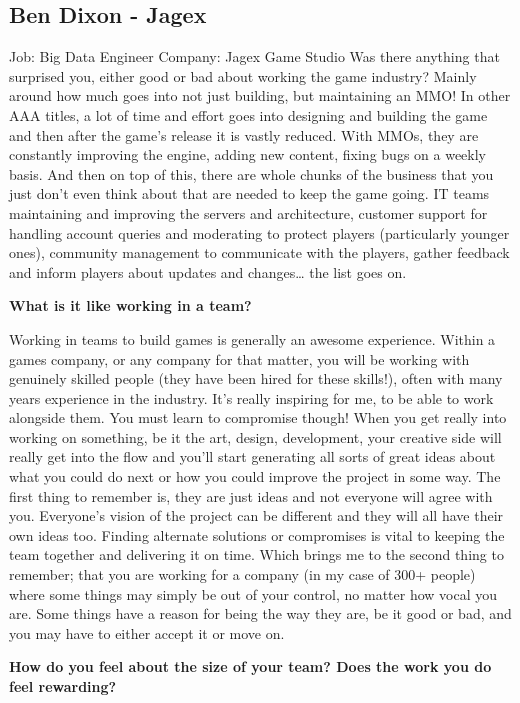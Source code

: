 \documentclass{scrartcl}
\begin{document}
\begin{itemize}
\begin{itemize}
\begin{appendices}
\section{Ben Dixon - Jagex}
Job: Big Data Engineer
Company: Jagex Game Studio
Was there anything that surprised you, either good or bad about working the game industry?
Mainly around how much goes into not just building, but maintaining an MMO! In other AAA titles, a lot of time and effort goes into designing and building the game and then after the game’s release it is vastly reduced. With MMOs, they are constantly improving the engine, adding new content, fixing bugs on a weekly basis.
And then on top of this, there are whole chunks of the business that you just don’t even think about that are needed to keep the game going. IT teams maintaining and improving the servers and architecture, customer support for handling account queries and moderating to protect players (particularly younger ones), community management to communicate with the players, gather feedback and inform players about updates and changes… the list goes on.    
\par
\textbf{What is it like working in a team?}
\par
Working in teams to build games is generally an awesome experience. Within a games company, or any company for that matter, you will be working with genuinely skilled people (they have been hired for these skills!), often with many years experience in the industry. It’s really inspiring for me, to be able to work alongside them.
You must learn to compromise though! When you get really into working on something, be it the art, design, development, your creative side will really get into the flow and you’ll start generating all sorts of great ideas about what you could do next or how you could improve the project in some way. The first thing to remember is, they are just ideas and not everyone will agree with you. Everyone’s vision of the project can be different and they will all have their own ideas too. Finding alternate solutions or compromises is vital to keeping the team together and delivering it on time. Which brings me to the second thing to remember; that you are working for a company (in my case of 300+ people) where some things may simply be out of your control, no matter how vocal you are. Some things have a reason for being the way they are, be it good or bad, and you may have to either accept it or move on.
\par
\textbf{How do you feel about the size of your team? Does the work you do feel rewarding?}

\end{appendices}
\end{itemize}
\end{itemize}
\end{document}
